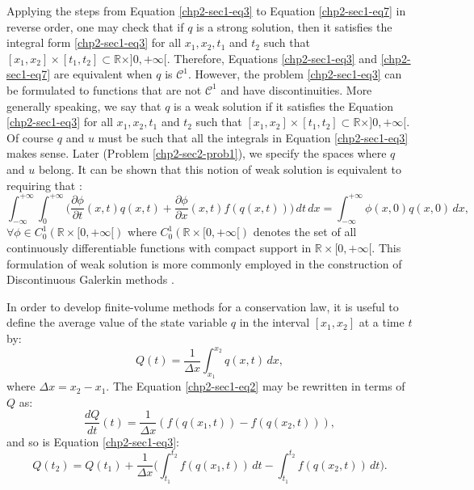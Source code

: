 Applying the steps from Equation \eqref{chp2-sec1-eq3} to Equation \eqref{chp2-sec1-eq7}
in reverse order, one may check that if ${q}$ is a strong solution,
then it satisfies the integral form \eqref{chp2-sec1-eq3} for all $x_1, x_2, t_1$ and $t_2$ such that
$[x_1, x_2] \times [t_1, t_2] \subset \mathbb{R}\times ]0, +\infty[$. 
Therefore, Equations \eqref{chp2-sec1-eq3} and \eqref{chp2-sec1-eq7} are
equivalent when ${q}$ is $\mathcal{C}^1$.
However, the problem \eqref{chp2-sec1-eq3} can be formulated
to functions that are not $\mathcal{C}^1$ and have discontinuities.
More generally speaking, we say that ${q}$ is a weak solution 
if it satisfies the Equation 
\eqref{chp2-sec1-eq3} for all $x_1, x_2, t_1$ and $t_2$ such that
$[x_1, x_2] \times [t_1, t_2] \subset \mathbb{R}\times ]0, +\infty[$.
Of course $q$ and $u$ must be such that all the integrals in Equation 
\eqref{chp2-sec1-eq3} makes sense. Later (Problem \ref {chp2-sec2-prob1}), we specify the spaces where $q$ and $u$ belong.
It can be shown that this notion of weak solution is equivalent to requiring that \citep{leveque:1990}:
\begin{equation}
	\label{chp2-sec1-eq8}
	\int_{-\infty}^{+\infty} \int_{0}^{+\infty} \bigg(
	\frac{\partial \phi}{\partial t} (x, t){q}(x, t) +
	\frac{\partial \phi}{\partial x} (x ,t){f}({q}(x, t)) 
	\bigg)\,dt \,dx = 
	\int_{-\infty}^{+\infty} \phi(x, 0){q}(x, 0) \,dx  , \quad
\end{equation}
$\forall \phi \in C_{0}^{1}(\mathbb{R}\times[0, +\infty[)$
where $C_{0}^{1}(\mathbb{R}\times[0, +\infty[)$ denotes the set
of all continuously differentiable functions with compact support 
in $\mathbb{R}\times[0, +\infty[$. This formulation of weak solution
is more commonly employed in the construction of Discontinuous Galerkin
methods \citep{nair:2011}.

In order to develop finite-volume methods for a conservation law, it is useful to define the
average value of the state variable ${q}$ in the interval $[x_1, x_2]$ at a time $t$ by:
\begin{equation}
	\label{chp2-sec1-eq9}
	{Q}(t) = \frac{1}{\Delta x}
	\int_{x_1}^{x_2} {q}(x,t) \,dx,
\end{equation}
where $\Delta x = x_2 - x_1$. The Equation \eqref{chp2-sec1-eq2} may be  rewritten in terms of ${Q}$ as:
\begin{equation}
        \label{chp2-sec1-eq10}
	\frac{dQ}{dt} (t) = \frac{1}{\Delta x} 
	({f}({q}(x_1,t)) - {f}({q}(x_2,t))) ,
\end{equation}
and so is Equation \eqref{chp2-sec1-eq3}:
\begin{equation}
        \label{chp2-sec1-eq11}
	{Q}(t_2) =  {Q}(t_1) + 
	\frac{1}{\Delta x}\bigg( \int_{t_1}^{t_2} 
	{f}({q}(x_1, t)) \,dt - 
	\int_{t_1}^{t_2}{f}({q}(x_2, t)) \,dt \bigg).
\end{equation}


